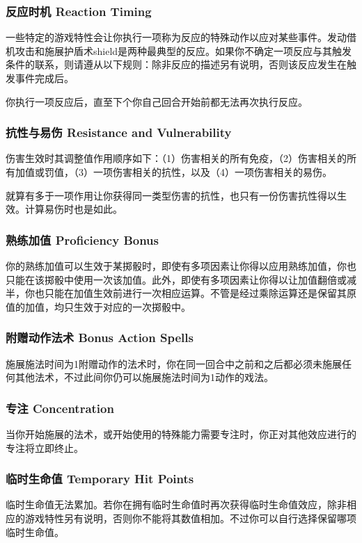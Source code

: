 \documentclass[letterpaper,10pt,twoside,twocolumn,openany]{dndbook}
\begin{document}
\subsubsection{反应时机 Reaction Timing  }
\par{一些特定的游戏特性会让你执行一项称为反应的特殊动作以应对某些事件。发动借机攻击和施展护盾术shield是两种最典型的反应。如果你不确定一项反应与其触发条件的联系，则请遵从以下规则：除非反应的描述另有说明，否则该反应发生在触发事件完成后。}
\par{你执行一项反应后，直至下个你自己回合开始前都无法再次执行反应。}
\subsubsection{抗性与易伤 Resistance and Vulnerability }
\par{伤害生效时其调整值作用顺序如下：（1）伤害相关的所有免疫，（2）伤害相关的所有加值或罚值，（3）一项伤害相关的抗性，以及（4）一项伤害相关的易伤。}
\par{就算有多于一项作用让你获得同一类型伤害的抗性，也只有一份伤害抗性得以生效。计算易伤时也是如此。}
\subsubsection{熟练加值 Proficiency Bonus }
\par{你的熟练加值可以生效于某掷骰时，即使有多项因素让你得以应用熟练加值，你也只能在该掷骰中使用一次该加值。此外，即使有多项因素让你得以让加值翻倍或减半，你也只能在加值生效前进行一次相应运算。不管是经过乘除运算还是保留其原值的加值，均只生效于对应的一次掷骰中。}
\subsubsection{附赠动作法术 Bonus Action Spells  }
\par{施展施法时间为1附赠动作的法术时，你在同一回合中之前和之后都必须未施展任何其他法术，不过此间你仍可以施展施法时间为1动作的戏法。}
\subsubsection{专注 Concentration }
\par{当你开始施展的法术，或开始使用的特殊能力需要专注时，你正对其他效应进行的专注将立即终止。}
\subsubsection{临时生命值 Temporary Hit Points }
\par{临时生命值无法累加。若你在拥有临时生命值时再次获得临时生命值效应，除非相应的游戏特性另有说明，否则你不能将其数值相加。不过你可以自行选择保留哪项临时生命值。}
\clearpage
\clearpage
\end{document}

